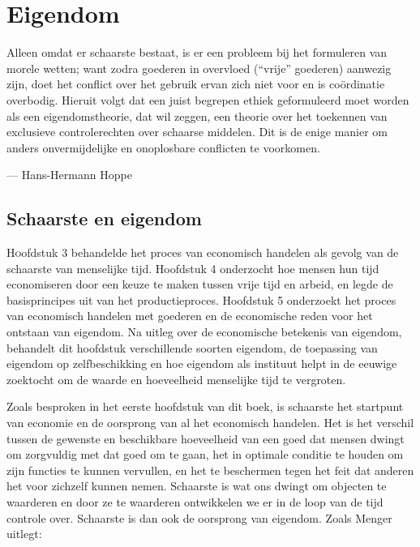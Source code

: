 \chapter{Eigendom}

\begin{blockquotebox}
    Alleen omdat er schaarste bestaat, is er een probleem bij het formuleren van morele wetten; want zodra goederen in overvloed (\enquote{vrije} goederen) aanwezig zijn, doet het conflict over het gebruik ervan zich niet voor en is coördinatie overbodig. Hieruit volgt dat een juist begrepen ethiek geformuleerd moet worden als een eigendomstheorie, dat wil zeggen, een theorie over het toekennen van exclusieve controlerechten over schaarse middelen. Dit is de enige manier om anders onvermijdelijke en onoplosbare conflicten te voorkomen.\footnotemark
    \par\raggedleft--- Hans-Hermann Hoppe
\end{blockquotebox}
\autocite{47}


\section{Schaarste en eigendom}

\lettrine{H}oofdstuk 3 behandelde het proces van economisch handelen als gevolg van de schaarste van menselijke tijd. Hoofdstuk 4 onderzocht hoe mensen hun tijd economiseren door een keuze te maken tussen vrije tijd en arbeid, en legde de basisprincipes uit van het productieproces. Hoofdstuk 5 onderzoekt het proces van economisch handelen met goederen en de economische reden voor het ontstaan van eigendom. Na uitleg over de economische betekenis van eigendom, behandelt dit hoofdstuk verschillende soorten eigendom, de toepassing van eigendom op zelfbeschikking en hoe eigendom als instituut helpt in de eeuwige zoektocht om de waarde en hoeveelheid menselijke tijd te vergroten.

Zoals besproken in het eerste hoofdstuk van dit boek, is schaarste het startpunt van economie en de oorsprong van al het economisch handelen. Het is het verschil tussen de gewenste en beschikbare hoeveelheid van een goed dat mensen dwingt om zorgvuldig met dat goed om te gaan, het in optimale conditie te houden om zijn functies te kunnen vervullen, en het te beschermen tegen het feit dat anderen het voor zichzelf kunnen nemen. Schaarste is wat ons dwingt om objecten te waarderen en door ze te waarderen ontwikkelen we er in de loop van de tijd controle over. Schaarste is dan ook de oorsprong van eigendom. Zoals Menger uitlegt:

